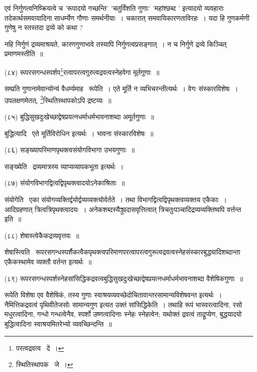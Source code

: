 \documentclass[11pt, openany]{book}
\begin{document}
{एवं निर्गुणत्वनिष्क्रियत्वे च 'रूपादयो गच्छन्ति' 'चतुर्विंशति गुणाः' 'महांश्छब्द ' इत्यादयो व्यवहाराः तदेकार्थसमवायादिना साधर्म्येण गौणाः समर्थनीयाः~। चकारात् समवायिकारणताविरहः~। यदा हि गुणकर्मणी गुणेषु न स्तस्तदा द्रव्ये को कथा ?

\newpage
\noindent
नहि निर्गुणं द्रव्यमाश्रयते, कारणगुणाभावे तस्यापि निर्गुणत्वप्रसङ्गात्~। न च निर्गुणे द्रव्ये किञ्चित् प्रमाणमस्तीति~॥

\hangindent=2cm {\knu (८४) रूपरसगन्धस्पर्शप\renewcommand{\thefootnote}{1}\footnote{परत्वद्रवत्व \textendash\ दे~।}रत्वापरत्वगुरुत्वद्रवत्वस्नेहवेगा मूर्तगुणाः~॥}

सम्प्रति गुणानामेवान्योन्यं वैधर्म्यमाह \textendash\ {\knu रूपेति}~। एते मूर्ति न व्यभिचरन्तीत्यर्थः~। वेगः संस्कारविशेषः~। उपलक्षणमेतत्, \renewcommand{\thefootnote}{2}\footnote{स्थितिस्थापक \textendash\ जे~।}स्थितिस्थापकोऽपि द्रष्टव्यः~॥

\hangindent=2cm {\knu (८५) बुद्धिसुखदुःखेच्छाद्वेषप्रयत्नधर्माधर्मभावनाशब्दा अमूर्तगुणाः~॥}

बुद्धित्यादि \textendash\ एते मूर्तिविरोधिन इत्यर्थः~। भावना संस्कारविशेषः~॥ 

\hangindent=2cm {\knu (८६) सङ्ख्यापरिमाणपृथक्त्वसंयोगविभागा उभयगुणाः~॥} 

{\knu सङ्ख्ये}ति \textendash\ द्रव्यमात्रस्य व्याप्यव्यापकभूता इत्यर्थः~।

\hangindent=2cm {\knu (८७) संयोगविभागद्वित्वद्विपृथक्त्वादयोऽनेकाश्रिताः~॥}

{\knu संयोगे}ति \textendash\ एका संयोगव्यक्तिर्द्वयोर्द्वव्यव्यक्त्योर्वर्तते~। तथा विभागद्वित्वद्विपृथक्त्वव्यक्तय एकैकाः~। आदिग्रहणात् त्रित्वत्रिपृथक्त्वादयः~। अनेकशब्दस्यैक्र्युदासवृत्तित्वात् त्रिचतुःपञ्चादिद्रव्यव्यक्तिष्वपि वर्त्तन्त इति~॥

{\knu (८८) शेषास्त्वेकैकद्रव्यवृत्तयः~॥}

{\knu शेषास्त्वि}ति \textendash\ रूपरसगन्धस्पर्शैकत्वैकपृथक्त्वपरिमाणपरत्वापरत्वगुरूत्वद्रवत्वस्नेहसंस्कारबुद्ध्यादिशब्दान्ता एकैकस्थामेव व्यक्तौ वर्तन्त इत्यर्थः~॥

\begin{sloppypar}
\hangindent=2cm {\knu (८९) रूपरसगन्धस्पर्शस्नेहसांसिद्धिकद्रवत्वबुद्धिसुखदुःखेच्छाद्वेषप्रयत्नधर्माधर्मभावनाशब्दा वैशेषिकगुणाः~॥}
\end{sloppypar}

{\knu रूपेति} विशेषा एव वैशेषिकं, तस्य गुणाः स्वाश्रयव्यवच्छेदोचितावान्तरसामान्यविशेषवन्त इत्यर्थः~। नैमित्तिकद्रवत्वं पृथिवीतेजसोः सामान्यगुण इत्यत उक्तं {\knu सांसिद्धिकेति~।} तथाहि रूपं भास्वरत्वादिना, रसो मधुरत्वादिना, गन्धो गन्धत्वेनैव, स्पर्शो उष्णत्वादिनाः स्नेहः स्नेहत्वेन; यथोक्तं द्रवत्वं ताद्रूप्येण, बुद्धयादयो बुद्धित्वादिना स्वाश्रयमितरेभ्यो व्यवच्छिन्दन्ति~॥

}
\end{document}
